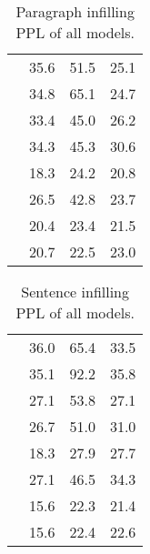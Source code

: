 \begin{table}[t]
    \centering
    \begin{tabular}[t]{lccc}
        \toprule
            & \sto{}   & \abs{}   & \lyr{} \\
        \midrule
\lmscratch{} & 35.6 & 51.5 & 25.1 \\
\lmrevscratch{} & 34.8 & 65.1 & 24.7 \\
\lmallscratch{} & 33.4 & 45.0 & 26.2 \\
\ilmscratch{} & 34.3 & 45.3 & 30.6 \\
\lm{} & 18.3 & 24.2 & 20.8 \\
\lmrev{} & 26.5 & 42.8 & 23.7 \\
\lmall{} & 20.4 & 23.4 & 21.5 \\
\ilm{} & 20.7 & 22.5 & 23.0 \\
        \bottomrule
    \end{tabular}
    \caption{
    Paragraph infilling PPL of all models.
    }
    \label{tab:granu_ppl_paragraphs}
\end{table}

\begin{table}[t]
    \centering
    \begin{tabular}[t]{lccc}
        \toprule
            & \sto{}   & \abs{}   & \lyr{} \\
        \midrule
\lmscratch{} & 36.0 & 65.4 & 33.5 \\
\lmrevscratch{} & 35.1 & 92.2 & 35.8 \\
\lmallscratch{} & 27.1 & 53.8 & 27.1 \\
\ilmscratch{} & 26.7 & 51.0 & 31.0 \\
\lm{} & 18.3 & 27.9 & 27.7 \\
\lmrev{} & 27.1 & 46.5 & 34.3 \\
\lmall{} & 15.6 & 22.3 & 21.4 \\
\ilm{} & 15.6 & 22.4 & 22.6 \\
        \bottomrule
    \end{tabular}
    \caption{Sentence infilling PPL of all models.}
    \label{tab:granu_ppl_sentences}
\end{table}

